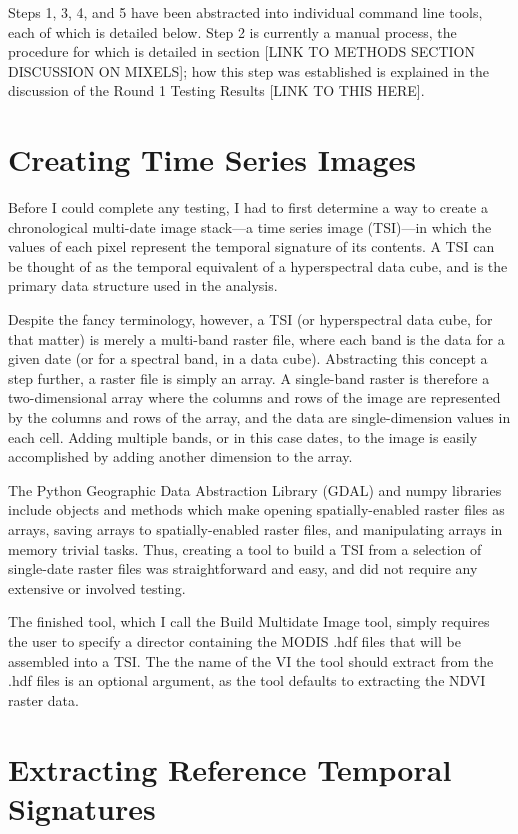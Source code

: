 Steps 1, 3, 4, and 5 have been abstracted into individual command line tools, each of which is detailed below. Step 2 is currently a manual process, the procedure for which is detailed in section [LINK TO METHODS SECTION DISCUSSION ON MIXELS]; how this step was established is explained in the discussion of the Round 1 Testing Results [LINK TO THIS HERE].

\section{Creating Time Series Images}

Before I could complete any testing, I had to first determine a way to create a chronological multi-date image stack—a time series image (TSI)—in which the values of each pixel represent the temporal signature of its contents. A TSI can be thought of as the temporal equivalent of a hyperspectral data cube, and is the primary data structure used in the analysis.

Despite the fancy terminology, however, a TSI (or hyperspectral data cube, for that matter) is merely a multi-band raster file, where each band is the data for a given date (or for a spectral band, in a data cube). Abstracting this concept a step further, a raster file is simply an array. A single-band raster is therefore a two-dimensional array where the columns and rows of the image are represented by the columns and rows of the array, and the data are single-dimension values in each cell. Adding multiple bands, or in this case dates, to the image is easily accomplished by adding another dimension to the array.

The Python Geographic Data Abstraction Library (GDAL) and numpy libraries include objects and methods which make opening spatially-enabled raster files as arrays, saving arrays to spatially-enabled raster files, and manipulating arrays in memory trivial tasks. Thus, creating a tool to build a TSI from a selection of single-date raster files was straightforward and easy, and did not require any extensive or involved testing.

The finished tool, which I call the Build Multidate Image tool, simply requires the user to specify a director containing the MODIS .hdf files that will be assembled into a TSI. The the name of the VI the tool should extract from the .hdf files is an optional argument, as the tool defaults to extracting the NDVI raster data.

\section{Extracting Reference Temporal Signatures}

